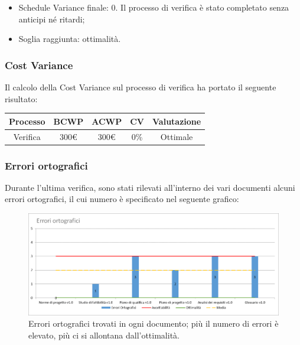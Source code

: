 \begin{itemize}
	\item Schedule Variance finale: 0. 
	Il processo di verifica è stato completato senza anticipi né ritardi;
	
	\item Soglia raggiunta: ottimalità.
\end{itemize}


\subsubsection{Cost Variance}
Il calcolo della Cost Variance sul processo di verifica ha portato il seguente risultato: 

{
	\renewcommand{\arraystretch}{2}
	\centering
	\begin{tabular}{| c | c | c | c | c |}
		\hline
		\textbf{Processo} & \textbf{BCWP} & \textbf{ACWP} & \textbf{CV} & \textbf{Valutazione} \\
		\hline
		Verifica & 300\euro & 300\euro & 0\% & Ottimale \\
		\hline
	\end{tabular}
	
}

\newpage

\subsubsection{Errori ortografici}
Durante l'ultima verifica, sono stati rilevati all'interno dei vari documenti alcuni errori ortografici, il cui numero è specificato nel seguente grafico:

\begin{figure}[h!]
	\centering
	\includegraphics[scale=0.6]{img/Grafici/Errori_orto.png}
	\caption{Errori ortografici trovati in ogni documento; più il numero di errori è elevato, più ci si allontana dall'ottimalità.}
	\label{fig:Errori_orto}
\end{figure}

